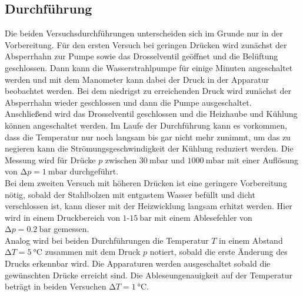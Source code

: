 \subsection{Durchführung}
Die beiden Versuchsdurchführungen unterscheiden sich im Grunde nur in der Vorbereitung. Für den ersten Versuch bei geringen Drücken wird zunächst der Absperrhahn zur Pumpe sowie das Drosselventil geöffnet und die Belüftung geschlossen. 
Dann kann die Wasserstrahlpumpe für einige Minuten angeschaltet werden und mit dem Manometer kann dabei der Druck in der Apparatur beobachtet werden. Bei dem niedrigst zu erreichenden Druck wird zunächst der Absperrhahn wieder geschlossen
und dann die Pumpe ausgeschaltet. Anschließend wird das Drosselventil geschlossen und die Heizhaube und Kühlung können angeschaltet werden.
Im Laufe der Durchführung kann es vorkommen, dass die Temperatur nur noch langsam bis gar nicht mehr zunimmt, um das zu negieren kann die Strömungsgeschwindigkeit der Kühlung reduziert werden.
Die Messung wird für Drücke $p$ zwischen $\SI{30}{\milli\bar}$ und $\SI{1000}{\milli\bar}$ mit einer Auflösung von $\increment p =\SI{1}{\milli\bar}$ durchgeführt.
\newline
\\
Bei dem zweiten Versuch mit höheren Drücken ist eine geringere Vorbereitung nötig, sobald der Stahlbolzen mit entgastem Wasser befüllt und dicht verschlossen ist, kann dieser mit der Heizwicklung langsam erhitzt werden.
Hier wird in einem Druckbereich von $1$-$\SI{15}{\bar}$ mit einem Ablesefehler von $\increment p = \SI{0.2}{\bar}$ gemessen.
\newline
\\
Analog wird bei beiden Durchführungen die Temperatur $T$ in einem Abstand $\increment T = \SI{5}{\celsius}$ zusammen mit dem Druck $p$ notiert, sobald die erste Änderung des Drucks erkennbar wird.
Die Apparaturen werden ausgeschaltet sobald die gewünschten Drücke erreicht sind. Die Ableseungenauigkeit auf der Temperatur beträgt in beiden Versuchen $\increment T = \SI{1}{\celsius}$.
